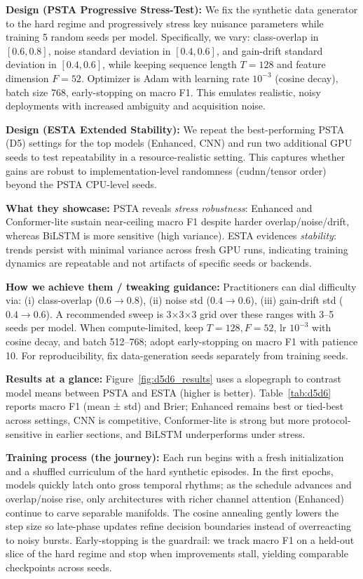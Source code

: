 \documentclass[journal]{IEEEtran}
\begin{document}
\textbf{Design (PSTA Progressive Stress-Test):} We fix the synthetic data generator to the hard regime and progressively stress key nuisance parameters while training 5 random seeds per model. Specifically, we vary: class-overlap in $[0.6,0.8]$, noise standard deviation in $[0.4,0.6]$, and gain-drift standard deviation in $[0.4,0.6]$, while keeping sequence length $T{=}128$ and feature dimension $F{=}52$. Optimizer is Adam with learning rate $10^{-3}$ (cosine decay), batch size 768, early-stopping on macro F1. This emulates realistic, noisy deployments with increased ambiguity and acquisition noise.

\textbf{Design (ESTA Extended Stability):} We repeat the best-performing PSTA (D5) settings for the top models (Enhanced, CNN) and run two additional GPU seeds to test repeatability in a resource-realistic setting. This captures whether gains are robust to implementation-level randomness (cudnn/tensor order) beyond the PSTA CPU-level seeds.

\textbf{What they showcase:} PSTA reveals \emph{stress robustness}: Enhanced and Conformer-lite sustain near-ceiling macro F1 despite harder overlap/noise/drift, whereas BiLSTM is more sensitive (high variance). ESTA evidences \emph{stability}: trends persist with minimal variance across fresh GPU runs, indicating training dynamics are repeatable and not artifacts of specific seeds or backends.

\textbf{How we achieve them / tweaking guidance:} Practitioners can dial difficulty via: (i) class-overlap ($0.6\rightarrow0.8$), (ii) noise std ($0.4\rightarrow0.6$), (iii) gain-drift std ($0.4\rightarrow0.6$). A recommended sweep is 3$\times$3$\times$3 grid over these ranges with 3--5 seeds per model. When compute-limited, keep $T{=}128,F{=}52$, lr $10^{-3}$ with cosine decay, and batch 512--768; adopt early-stopping on macro F1 with patience 10. For reproducibility, fix data-generation seeds separately from training seeds.

\textbf{Results at a glance:} Figure~\ref{fig:d5d6_results} uses a slopegraph to contrast model means between PSTA and ESTA (higher is better). Table~\ref{tab:d5d6} reports macro F1 (mean ± std) and Brier; Enhanced remains best or tied-best across settings, CNN is competitive, Conformer-lite is strong but more protocol-sensitive in earlier sections, and BiLSTM underperforms under stress.

\textbf{Training process (the journey):} Each run begins with a fresh initialization and a shuffled curriculum of the hard synthetic episodes. In the first epochs, models quickly latch onto gross temporal rhythms; as the schedule advances and overlap/noise rise, only architectures with richer channel attention (Enhanced) continue to carve separable manifolds. The cosine annealing gently lowers the step size so late-phase updates refine decision boundaries instead of overreacting to noisy bursts. Early-stopping is the guardrail: we track macro F1 on a held-out slice of the hard regime and stop when improvements stall, yielding comparable checkpoints across seeds.
\end{document}

